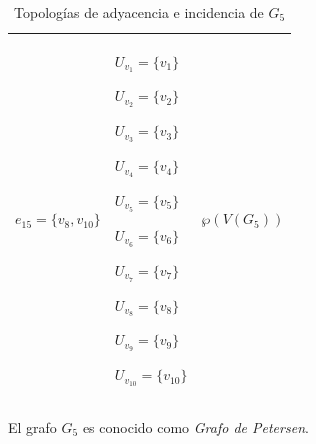 \begin{table}[p]
\begin{tabular}{@{}>{\centering\arraybackslash}m{}>{\centering\arraybackslash}m{}>{\centering\arraybackslash}m{}@{}}
         ${e_{15}=\{v_8,v_{10}\}}$
      &
         ${U_{v_1}=\{v_1\}}$\par
         ${U_{v_2}=\{v_2\}}$\par
         ${U_{v_3}=\{v_3\}}$\par
         ${U_{v_4}=\{v_4\}}$\par
         ${U_{v_5}=\{v_5\}}$\par
         ${U_{v_6}=\{v_6\}}$\par
         ${U_{v_7}=\{v_7\}}$\par
         ${U_{v_8}=\{v_8\}}$\par
         ${U_{v_9}=\{v_9\}}$\par
         ${U_{v_{10}}=\{v_{10}\}}$
      &
         $\wp\left(V\left(G_5\right)\right)$ \\[6pt]
      \hline
   \end{tabular}
   \caption{Topologías de adyacencia e incidencia de $G_5$}
   \label{tab:topologias_G_5}

   \vspace{1em}
   \begin{minipage}{\textwidth}
      \normalsize
      El grafo $G_5$ es conocido como \textit{Grafo de Petersen}.
   \end{minipage}
\end{table}
